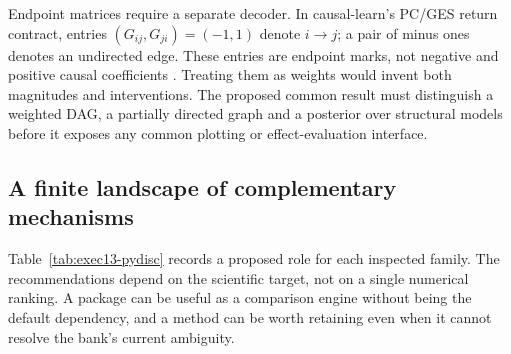Endpoint matrices require a separate decoder. In causal-learn's PC/GES return
contract, entries \((G_{ij},G_{ji})=(-1,1)\) denote \(i\to j\); a pair of
minus ones denotes an undirected edge. These entries are endpoint marks, not
negative and positive causal coefficients \citep{exec13_pydisc_causallearn}.
Treating them as weights would invent both magnitudes and interventions. The
proposed common result must distinguish a weighted DAG, a partially directed
graph and a posterior over structural models before it exposes any common
plotting or effect-evaluation interface.

\subsection{A finite landscape of complementary mechanisms}

Table~\ref{tab:exec13-pydisc} records a proposed role for each inspected family.
The recommendations depend on the scientific target, not on a single numerical
ranking. A package can be useful as a comparison engine without being the
default dependency, and a method can be worth retaining even when it cannot
resolve the bank's current ambiguity.

